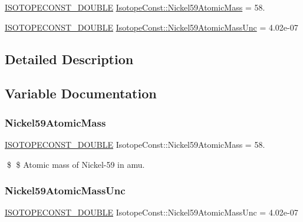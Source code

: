 \begin{DoxyCompactItemize}
\item 
\mbox{\hyperlink{group___isotope_const-_macros_ga8f45a7272ce02c0b4c65c44636ed719a}{I\+S\+O\+T\+O\+P\+E\+C\+O\+N\+S\+T\+\_\+\+D\+O\+U\+B\+LE}} \mbox{\hyperlink{group___isotope_const-_nickel-_ni59_ga76da0f129a35af435d8903170789f8f9}{Isotope\+Const\+::\+Nickel59\+Atomic\+Mass}} = 58.
\item 
\mbox{\hyperlink{group___isotope_const-_macros_ga8f45a7272ce02c0b4c65c44636ed719a}{I\+S\+O\+T\+O\+P\+E\+C\+O\+N\+S\+T\+\_\+\+D\+O\+U\+B\+LE}} \mbox{\hyperlink{group___isotope_const-_nickel-_ni59_ga54bff818af637d77d53bdca7ae6e43b7}{Isotope\+Const\+::\+Nickel59\+Atomic\+Mass\+Unc}} = 4.\+02e-\/07
\end{DoxyCompactItemize}


\subsection{Detailed Description}


\subsection{Variable Documentation}
\mbox{\label{group___isotope_const-_nickel-_ni59_ga76da0f129a35af435d8903170789f8f9}} 
\subsubsection{\texorpdfstring{Nickel59\+Atomic\+Mass}{Nickel59AtomicMass}}
{\footnotesize\ttfamily \mbox{\hyperlink{group___isotope_const-_macros_ga8f45a7272ce02c0b4c65c44636ed719a}{I\+S\+O\+T\+O\+P\+E\+C\+O\+N\+S\+T\+\_\+\+D\+O\+U\+B\+LE}} Isotope\+Const\+::\+Nickel59\+Atomic\+Mass = 58.}

\$ \$ Atomic mass of Nickel-\/59 in amu. \mbox{\label{group___isotope_const-_nickel-_ni59_ga54bff818af637d77d53bdca7ae6e43b7}} 
\subsubsection{\texorpdfstring{Nickel59\+Atomic\+Mass\+Unc}{Nickel59AtomicMassUnc}}
{\footnotesize\ttfamily \mbox{\hyperlink{group___isotope_const-_macros_ga8f45a7272ce02c0b4c65c44636ed719a}{I\+S\+O\+T\+O\+P\+E\+C\+O\+N\+S\+T\+\_\+\+D\+O\+U\+B\+LE}} Isotope\+Const\+::\+Nickel59\+Atomic\+Mass\+Unc = 4.\+02e-\/07}

